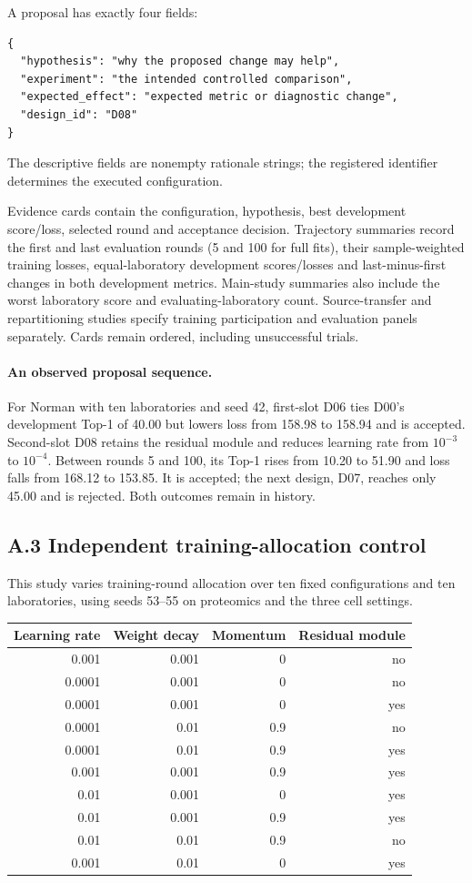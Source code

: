 A proposal has exactly four fields:
\begin{verbatim}
{
  "hypothesis": "why the proposed change may help",
  "experiment": "the intended controlled comparison",
  "expected_effect": "expected metric or diagnostic change",
  "design_id": "D08"
}
\end{verbatim}
The descriptive fields are nonempty rationale strings; the registered identifier determines the executed configuration.

Evidence cards contain the configuration, hypothesis, best development score/loss, selected round and acceptance decision. Trajectory summaries record the first and last evaluation rounds (5 and 100 for full fits), their sample-weighted training losses, equal-laboratory development scores/losses and last-minus-first changes in both development metrics. Main-study summaries also include the worst laboratory score and evaluating-laboratory count. Source-transfer and repartitioning studies specify training participation and evaluation panels separately. Cards remain ordered, including unsuccessful trials.

\paragraph{An observed proposal sequence.}
For Norman with ten laboratories and seed 42, first-slot D06 ties D00's development Top-1 of 40.00 but lowers loss from 158.98 to 158.94 and is accepted. Second-slot D08 retains the residual module and reduces learning rate from $10^{-3}$ to $10^{-4}$. Between rounds 5 and 100, its Top-1 rises from 10.20 to 51.90 and loss falls from 168.12 to 153.85. It is accepted; the next design, D07, reaches only 45.00 and is rejected. Both outcomes remain in history.

\subsection*{A.3 Independent training-allocation control}
This study varies training-round allocation over ten fixed configurations and ten laboratories, using seeds 53--55 on proteomics and the three cell settings.

\begin{center}\small
\begin{tabular}{rrrr}
\toprule
Learning rate & Weight decay & Momentum & Residual module \\
\midrule
0.001 & 0.001 & 0 & no \\
0.0001 & 0.001 & 0 & no \\
0.0001 & 0.001 & 0 & yes \\
0.0001 & 0.01 & 0.9 & no \\
0.0001 & 0.01 & 0.9 & yes \\
0.001 & 0.001 & 0.9 & yes \\
0.01 & 0.001 & 0 & yes \\
0.01 & 0.001 & 0.9 & yes \\
0.01 & 0.01 & 0.9 & no \\
0.001 & 0.01 & 0 & yes \\
\bottomrule
\end{tabular}
\end{center}


